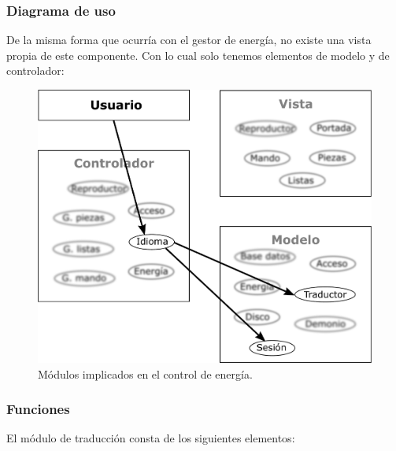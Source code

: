 \subsubsection{Diagrama de uso}

De la misma forma que ocurría con el gestor de energía, no existe una vista propia de este componente. Con lo cual solo tenemos elementos de modelo y de controlador:

\smallskip

\begin{figure}[H]
	\noindent \begin{centering}
		\includegraphics[width=\linewidth/2]{capitulo4/mvc_idioma}
		\par\end{centering}
	\smallskip
	\caption{\label{fig:mvc_idioma} Módulos implicados en el control de energía.}
\end{figure} 

\smallskip

\subsubsection{Funciones}

El módulo de traducción consta de los siguientes elementos:

